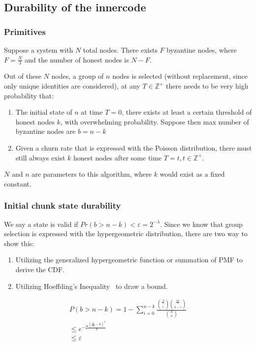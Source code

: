 \subsection{Durability of the innercode}
\subsubsection{Primitives}

Suppose a system with $N$ total nodes. There exists $F$ byzantine nodes, where $F = \frac{N}{3}$ and the number of honest nodes is $N-F$. 

Out of these $N$ nodes, a group of $n$ nodes is selected (without replacement, since only unique identities are considered), at any $T\in \mathbb{Z}^{+}$ there needs to be very high probability that:
\begin{enumerate}
    \item The initial state of $n$ at time $T=0$, there exists at least a certain threshold of honest nodes $k$, with overwhelming probability. Suppose then max number of byzantine nodes are $b = n-k$ 
    \item Given a churn rate that is expressed with the Poisson distribution, there must still always exist $k$ honest nodes after some time $T=t,t\in \mathbb{Z}^{+}$. 
\end{enumerate}

$N$ and $n$ are parameters to this algorithm, where $k$ would exist as a fixed constant. 

\subsubsection{Initial chunk state durability}

We say a state is valid if $Pr(b>n-k) < \varepsilon = 2^{-\lambda}$. Since we know that group selection is expressed with the hypergeometric distribution, there are two way to show this:
\begin{enumerate}
    \item Utilizing the generalized hypergeometric function or summation of PMF to derive the CDF. 
    \item Utilizing Hoeffding's Inequality~\cite{Hoeffding1963ProbabilityIF} to draw a bound.
\end{enumerate}


\begin{gather}
    P(b > n-k) = 1- \sum_{i=0}^{n-k}\frac{\binom{\frac{N}{3}}{i}\binom{\frac{2N}{3}}{n-i}}{\binom{N}{n}} \\
    \leq 
    e^{-2\frac{(\frac{2n}{3}-k)^{2}}{n}} \\
    \leq \varepsilon
\end{gather}

